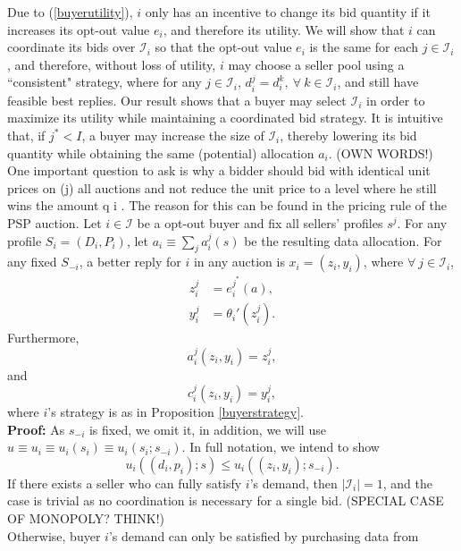 \documentclass[12pt]{article}
\theoremstyle{definition}
\newcommand{\mcI}{\mathcal{I}}
\begin{document}
\begin{multicols}{2}
Due to (\ref{buyerutility}), $i$ only has an incentive to change its bid
quantity if it increases its opt-out value $e_i$, and therefore its utility. 
We will show that $i$ can coordinate its
bids over $\mcI_i$ so that the opt-out value $e_i$ is the same for each
$j \in\mcI_i$, and therefore, without loss of utility, $i$ may choose a seller pool 
using a ``consistent" strategy, where for any $j\in \mcI_i$, $d_i^j = d_i^k, \
\forall \ k \in \mcI_i$, and still have feasible best replies. 
Our result shows that a buyer may select $\mcI_i$ in order to maximize its
utility while maintaining a coordinated bid strategy. 
It is intuitive that, if $j^*
< I$, a buyer may increase the size of $\mcI_i$, thereby lowering its bid
quantity while obtaining the same (potential) allocation $a_i$. 
(OWN WORDS!)
One important question to ask is why a bidder should bid with identical unit
prices on (j) all auctions and not reduce the unit price to a level where he still wins the
amount q i . The reason for this can be found in the pricing rule of the PSP auction. 
{
\label{coordinationlemma} 
Let $i\in\mcI$ be a opt-out buyer and fix all sellers' profiles $s^j$.
For any profile $S_i = (D_i, P_i)$, let $a_i \equiv \sum_j a_i^j(s)$ be the resulting data
allocation. For any fixed $S_{-i}$, a better reply for $i$ in any auction is $x_i =
(z_i,y_i)$, where $\forall \ j \in \mcI_i$,
\begin{align*}
    z_i^j &= e_i^{j^*}(a), \\
    y_i^j &= \theta_i'(z_i^j).
\end{align*}
Furthermore,
\begin{equation}\label{allocationcoordination}
    a_i^j(z_i,y_i) = z_i^{j},
\end{equation}
and
\begin{equation}\label{costcoordination}
    c_i^j(z_i,y_i) = y_i^{j},
\end{equation}
where $i$'s strategy is as in Proposition \ref{buyerstrategy}.
}\\
\textbf{Proof:}
As $s_{-i}$ is fixed, we omit it, in addition, we will use $u\equiv u_i \equiv u_i(s_i) \equiv
u_i(s_i;s_{-i})$. In full notation, we intend to show
$$
    u_i((d_i,p_i);s) \le u_i((z_i,y_i);s_{-i}).
$$
If there exists a seller who can fully satisfy $i$'s demand,
then $\vert\mcI_i\vert = 1$, and the case is trivial as no
coordination is necessary for a single bid. (SPECIAL CASE OF MONOPOLY? THINK!)\\
Otherwise, buyer $i$'s demand can only be satisfied by purchasing data from

\end{multicols}
\end{document}
